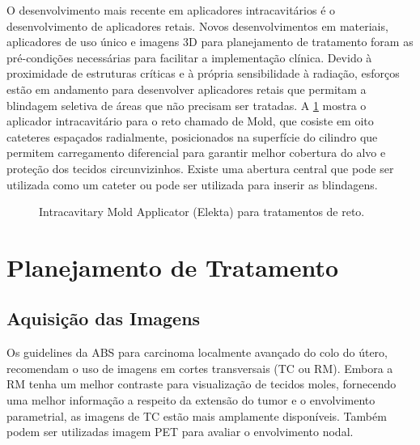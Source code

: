 \documentclass[11pt,a4paper]{article}
\begin{document}
	O desenvolvimento mais recente em aplicadores intracavitários é o desenvolvimento de aplicadores retais. Novos desenvolvimentos em materiais, aplicadores de uso único e imagens 3D para planejamento de tratamento foram as pré-condições necessárias para facilitar a implementação clínica. Devido à proximidade de estruturas críticas e à própria sensibilidade à radiação, esforços estão em andamento para desenvolver aplicadores retais que permitam a blindagem seletiva de áreas que não precisam ser tratadas. A \ref{fig:aplicadorReto} mostra o aplicador intracavitário para o reto chamado de Mold, que cosiste em oito cateteres espaçados radialmente, posicionados na superfície do cilindro que permitem carregamento diferencial para garantir melhor cobertura do alvo e proteção dos tecidos circunvizinhos. Existe uma abertura central que pode ser utilizada como um cateter ou pode ser utilizada para inserir as blindagens. 

	\begin{figure}[h]
		\centering
		\caption{Intracavitary Mold Applicator (Elekta) para tratamentos de reto. }
		\label{fig:aplicadorReto}
	\end{figure}

\section{Planejamento de Tratamento}

\subsection*{Aquisição das Imagens}

	Os guidelines da ABS para carcinoma localmente avançado do colo do útero, recomendam o uso de imagens em cortes transversais (TC ou RM). Embora a RM tenha um melhor contraste para visualização de tecidos moles, fornecendo uma melhor informação a respeito da extensão do tumor e o envolvimento parametrial, as imagens de TC estão mais amplamente disponíveis. Também podem ser utilizadas imagem PET para avaliar o envolvimento nodal. 
	
\end{document}
